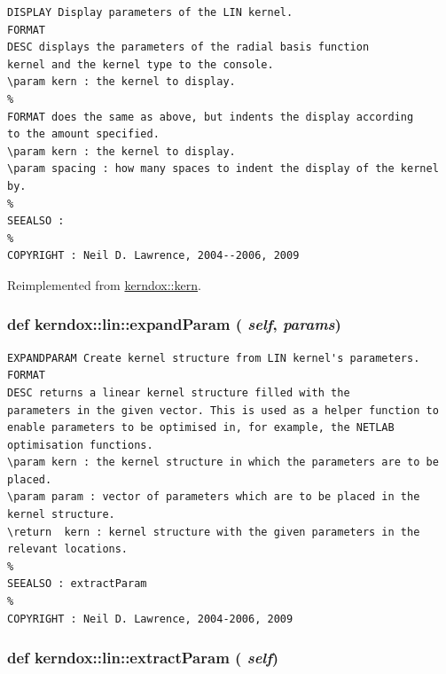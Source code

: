 \footnotesize\begin{verbatim}DISPLAY Display parameters of the LIN kernel.
FORMAT
DESC displays the parameters of the radial basis function
kernel and the kernel type to the console.
\param kern : the kernel to display.
%
FORMAT does the same as above, but indents the display according
to the amount specified.
\param kern : the kernel to display.
\param spacing : how many spaces to indent the display of the kernel by.
%
SEEALSO :
%
COPYRIGHT : Neil D. Lawrence, 2004--2006, 2009

\end{verbatim}
\normalsize
 

Reimplemented from \hyperlink{classkerndox_1_1kern}{kerndox::kern}.\hypertarget{classkerndox_1_1lin_1bd885c09b72a881bf508622e6081446}{
\subsubsection[{expandParam}]{\setlength{\rightskip}{0pt plus 5cm}def kerndox::lin::expandParam ( {\em self}, \/   {\em params})}}
\label{classkerndox_1_1lin_1bd885c09b72a881bf508622e6081446}




\footnotesize\begin{verbatim}EXPANDPARAM Create kernel structure from LIN kernel's parameters.
FORMAT
DESC returns a linear kernel structure filled with the
parameters in the given vector. This is used as a helper function to
enable parameters to be optimised in, for example, the NETLAB
optimisation functions.
\param kern : the kernel structure in which the parameters are to be
placed.
\param param : vector of parameters which are to be placed in the
kernel structure.
\return  kern : kernel structure with the given parameters in the
relevant locations.
%
SEEALSO : extractParam
%
COPYRIGHT : Neil D. Lawrence, 2004-2006, 2009\end{verbatim}
\normalsize
 \hypertarget{classkerndox_1_1lin_7b932181554ce33a7f1cbbc3e916a074}{
\subsubsection[{extractParam}]{\setlength{\rightskip}{0pt plus 5cm}def kerndox::lin::extractParam ( {\em self})}}
\label{classkerndox_1_1lin_7b932181554ce33a7f1cbbc3e916a074}




